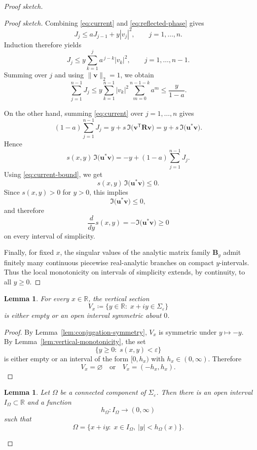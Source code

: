 \documentclass[11pt]{article}
\newtheorem{lemma}[theorem]{Lemma}
\begin{document}
\begin{proof}[Proof sketch]
\begin{proof}[Proof sketch]
Combining \eqref{eq:current} and \eqref{eq:reflected-phase} gives
\[
J_j\le aJ_{j-1}+y|v_j|^2,
\qquad
j=1,\dots,n.
\]
Induction therefore yields
\[
J_j
\le
y\sum_{k=1}^j a^{\,j-k}|v_k|^2,
\qquad
j=1,\dots,n-1.
\]
Summing over \(j\) and using \(\|\mathbf v\|_2=1\), we obtain
\[
\sum_{j=1}^{n-1}J_j
\le
y\sum_{k=1}^{n-1}|v_k|^2\sum_{m=0}^{n-1-k}a^m
\le
\frac{y}{1-a}.
\tag{$***$}
\label{eq:current-bound}
\]

On the other hand, summing \eqref{eq:current} over \(j=1,\dots,n\) gives
\[
(1-a)\sum_{j=1}^{n-1}J_j
=
y+s\,\Im\!\bigl(\mathbf v^{\mathsf T}\mathbf R\mathbf v\bigr)
=
y+s\,\Im\!\bigl(\mathbf u^*\mathbf v\bigr).
\]
Hence
\[
s(x,y)\,\Im\!\bigl(\mathbf u^*\mathbf v\bigr)
=
-y+(1-a)\sum_{j=1}^{n-1}J_j.
\]
Using \eqref{eq:current-bound}, we get
\[
s(x,y)\,\Im\!\bigl(\mathbf u^*\mathbf v\bigr)\le 0.
\]
Since \(s(x,y)>0\) for \(y>0\), this implies
\[
\Im\!\bigl(\mathbf u^*\mathbf v\bigr)\le 0,
\]
and therefore
\[
\frac{d}{dy}s(x,y)
=
-\Im\!\bigl(\mathbf u^*\mathbf v\bigr)\ge 0
\]
on every interval of simplicity.

Finally, for fixed \(x\), the singular values of the analytic matrix family \(\mathbf B_y\)
admit finitely many continuous piecewise real-analytic branches on compact \(y\)-intervals.
Thus the local monotonicity on intervals of simplicity extends, by continuity, to all
\(y\ge 0\).
\end{proof}

\begin{lemma}\label{lem:vertical-sections}
For every \(x\in\mathbb R\), the vertical section
\[
V_x
\coloneqq
\{y\in\mathbb R:\; x+iy\in\Sigma_\varepsilon\}
\]
is either empty or an open interval symmetric about \(0\).
\end{lemma}

\begin{proof}
By Lemma~\ref{lem:conjugation-symmetry}, \(V_x\) is symmetric under \(y\mapsto -y\).
By Lemma~\ref{lem:vertical-monotonicity}, the set
\[
\{y\ge 0:\; s(x,y)<\varepsilon\}
\]
is either empty or an interval of the form \([0,h_x)\) with \(h_x\in(0,\infty)\).
Therefore
\[
V_x=\varnothing
\quad\text{or}\quad
V_x=(-h_x,h_x).
\]
\end{proof}

\begin{lemma}\label{lem:component-fibers}
Let \(\Omega\) be a connected component of \(\Sigma_\varepsilon\). Then there is an
open interval \(I_\Omega\subset\mathbb R\) and a function
\[
h_\Omega:I_\Omega\to(0,\infty)
\]
such that
\[
\Omega
=
\{x+iy:\; x\in I_\Omega,\ |y|<h_\Omega(x)\}.
\]
\end{lemma}


\end{proof}
\end{document}

